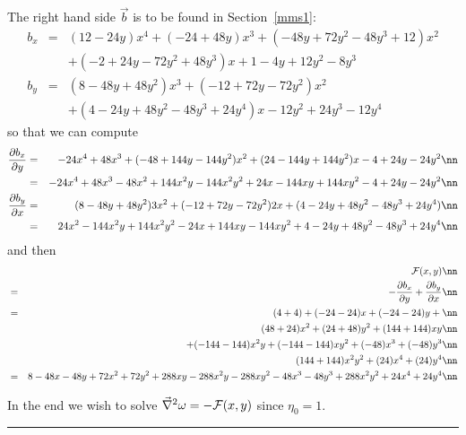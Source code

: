 The right hand side $\vec{b}$ is to be found in Section~\ref{mms1}:
\begin{eqnarray}
b_x &=& (12 - 24y) x^4 + (-24 + 48y) x^3 + (-48y + 72y^2 - 48 y^3 + 12) x^2 \nonumber\\
    && + (-2 + 24y -72y^2+48y^3)x + 1-4y + 12y^2-8y^3 \nonumber\\ 
b_y &=& (8 - 48y + 48 y^2) x^3 + (-12 + 72y - 72y^2) x^2  \nonumber\\
    && + (4 - 24y + 48y^2 - 48y^3 + 24y^4) x - 12y^2 + 24y^3 - 12y^4  \nonumber
\end{eqnarray}
so that we can compute 
\begin{eqnarray}
\frac{\partial b_x}{\partial y}
&=& -24 x^4 + 48 x^3 + (-48 + 144y - 144 y^2 ) x^2  + ( 24 -144 y+ 144y^2)x -4 + 24y-24y^2 \nn\\ 
&=& -24 x^4 + 48 x^3 -48x^2 + 144x^2y - 144 x^2y^2 +  24x -144x y+ 144xy^2  -4 + 24y-24y^2 \nn\\ 
\frac{\partial b_y}{\partial x} 
&=& (8 - 48y + 48 y^2) 3x^2 + (-12 + 72y - 72y^2) 2x  + (4 - 24y + 48y^2 - 48y^3 + 24y^4)   \nn\\
&=& 24x^2 - 144x^2y + 144x^2 y^2 -24x + 144xy - 144xy^2 + 4 - 24y + 48y^2 - 48y^3 + 24y^4   \nn
\end{eqnarray}
and then 
\begin{eqnarray}
&&{\cal F}(x,y)\nn\\
&=&-\frac{\partial b_x}{\partial y}
+\frac{\partial b_y}{\partial x} \nn\\
&=&(4+4)+(-24-24)x+(-24-24)y+ \nn\\
&&(48+24)x^2 + (24+48)y^2 +(144+144)xy \nn\\
&&+ (-144-144)x^2y + (-144-144)xy^2 + (-48)x^3 + (-48)y^3 \nn\\
&& (144+144)x^2y^2  +(24)x^4+(24)y^4 \nn\\
&=& 8 -48x-48y + 72x^2 +72y^2 + 288 xy -288x^2y -288 xy^2 -48x^3-48y^3 + 288x^2y^2 +24x^4 +24 y^4 \nn
\end{eqnarray}

In the end we wish to solve $\vec\nabla^2 \omega = -{\cal F}(x,y)$ since $\eta_0=1$.












\par\noindent\rule{\textwidth}{0.4pt}

\vspace{.5cm}

\begin{center}
\end{center}

